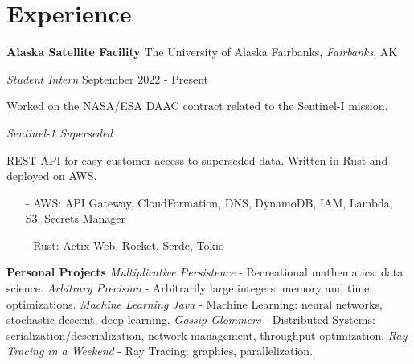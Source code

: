 ﻿\section{Experience}

\textbf{Alaska Satellite Facility}
\hfill
The University of Alaska Fairbanks, \textit{Fairbanks}, AK

\textit{Student Intern}
\hfill
{September 2022 - Present}

\bigbreak

Worked on the NASA/ESA DAAC contract related to the Sentinel-I mission.

\bigbreak

\textit{Sentinel-1 Superseded}

REST API for easy customer access to superseded data. Written in Rust and deployed on AWS.

\begin{itemize}\setlength\itemsep{-0.15cm}
    \item [-] AWS: API Gateway, CloudFormation, DNS, DynamoDB, IAM, Lambda, S3, Secrets Manager
    \item [-] Rust: Actix Web, Rocket, Serde, Tokio
\end{itemize}

\textbf{Personal Projects}
\bigbreak
\textit{Multiplicative Persistence} - Recreational mathematics: data science.
\bigbreak
\textit{Arbitrary Precision} - Arbitrarily large integers: memory and time optimizations.
\bigbreak
\textit{Machine Learning Java} - Machine Learning: neural networks, stochastic descent, deep learning.
\bigbreak
\textit{Gossip Glommers} - Distributed Systems: serialization/deserialization, network management, throughput optimization.
\bigbreak
\textit{Ray Tracing in a Weekend} - Ray Tracing: graphics, parallelization.